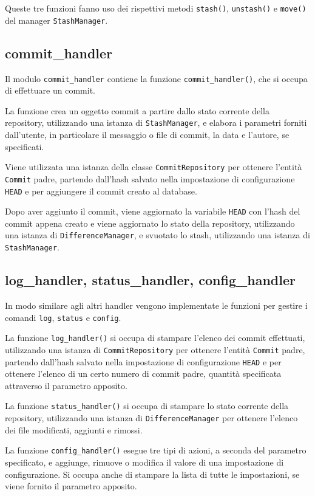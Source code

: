Queste tre funzioni fanno uso dei rispettivi metodi \texttt{stash()}, \texttt{unstash()} e \texttt{move()} del manager \texttt{StashManager}.

\subsection{commit\_handler}
Il modulo \texttt{commit\_handler} contiene la funzione \texttt{commit\_handler()}, che si occupa di effettuare un commit.

La funzione crea un oggetto commit a partire dallo stato corrente della repository, utilizzando una istanza di \texttt{StashManager}, e elabora i parametri forniti dall'utente, in particolare il messaggio o file di commit, la data e l'autore, se specificati.

Viene utilizzata una istanza della classe \texttt{CommitRepository} per ottenere l'entità \texttt{Commit} padre, partendo dall'hash salvato nella impostazione di configurazione \texttt{HEAD} e per aggiungere il commit creato al database.

Dopo aver aggiunto il commit, viene aggiornato la variabile \texttt{HEAD} con l'hash del commit appena creato e viene aggiornato lo stato della repository, utilizzando una istanza di \texttt{DifferenceManager}, e svuotato lo stash, utilizzando una istanza di \texttt{StashManager}.

\subsection{log\_handler, status\_handler, config\_handler}
In modo similare agli altri handler vengono implementate le funzioni per gestire i comandi \texttt{log}, \texttt{status} e \texttt{config}.

La funzione \texttt{log\_handler()} si occupa di stampare l'elenco dei commit effettuati, utilizzando una istanza di \texttt{CommitRepository} per ottenere l'entità \texttt{Commit} padre, partendo dall'hash salvato nella impostazione di configurazione \texttt{HEAD} e per ottenere l'elenco di un certo numero di commit padre, quantità specificata attraverso il parametro apposito.

La funzione \texttt{status\_handler()} si occupa di stampare lo stato corrente della repository, utilizzando una istanza di \texttt{DifferenceManager} per ottenere l'elenco dei file modificati, aggiunti e rimossi. 

La funzione \texttt{config\_handler()} esegue tre tipi di azioni, a seconda del parametro specificato, e aggiunge, rimuove o modifica il valore di una impostazione di configurazione. Si occupa anche di stampare la lista di tutte le impostazioni, se viene fornito il parametro apposito.


